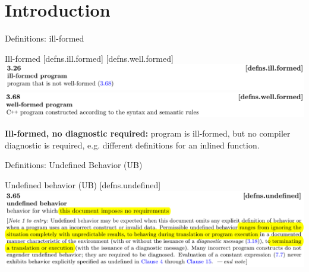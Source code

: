 \section{Introduction}

\begin{frame}{Definitions: ill-formed}
  \begin{block}{Ill-formed [defns.ill.formed] [defns.well.formed]}
    \includegraphics[width=\textwidth]{img/cplusplus_draft/defns.ill.formed.png}\\[1em]
    \includegraphics[width=\textwidth]{img/cplusplus_draft/defns.well.formed.png}

    \vspace{1em}
    {\bfseries Ill-formed, no diagnostic required:} program is ill-formed, but no compiler diagnostic is required, e.g. different definitions for an inlined function.
  \end{block}
\end{frame}

\begin{frame}{Definitions: Undefined Behavior (UB)}
  \begin{block}{Undefined behavior (UB) [defns.undefined]}
    \includegraphics[width=\textwidth]{img/cplusplus_draft/defns.undefined.png}
  \end{block}
\end{frame}

